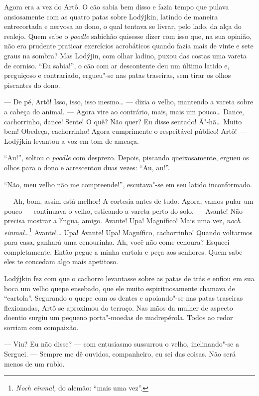 Agora era a vez do Artô. O cão sabia bem disso e fazia tempo que pulava
ansiosamente com as quatro patas sobre Lodýjkin, latindo de maneira
entrecortada e nervosa ao dono, o qual tentava se livrar, pelo lado, da
alça do realejo. Quem sabe o \emph{poodle} sabichão quisesse dizer com
isso que, na sua opinião, não era prudente praticar exercícios
acrobáticos quando fazia mais de vinte e sete graus na sombra? Mas
Lodýjin, com olhar ladino, puxou das costas uma vareta de corniso. ``Eu
sabia!'', o cão com ar descontente deu um último latido e, preguiçoso e
contrariado, ergueu"-se nas patas traseiras, sem tirar os olhos piscantes
do dono.

--- De pé, Artô! Isso, isso, isso mesmo\ldots{} --- dizia o velho, mantendo a
vareta sobre a cabeça do animal. --- Agora vire ao contrário, mais, mais
um pouco\ldots{} Dance, cachorrinho, dance! Sente! O quê? Não quer? Eu disse
sentado! Ã"-hã\ldots{} Muito bem! Obedeça, cachorrinho! Agora cumprimente o
respeitável público! Artô! --- Lodýjkin levantou a voz em tom de ameaça.

``Au!'', soltou o \emph{poodle} com desprezo. Depois, piscando queixosamente,
ergueu os olhos para o dono e acrescentou duas vezes: ``Au, au!''.

``Não, meu velho não me compreende!'', escutava"-se em seu latido
inconformado.

--- Ah, bom, assim está melhor! A cortesia antes de tudo. Agora, vamos
pular um pouco --- continuava o velho, esticando a vareta perto do solo.
--- Avante! Não precisa mostrar a língua, amigo. Avante! Upa! Magnífico!
Mais uma vez, \emph{noch einmal}\ldots{}\footnote{\emph{Noch einmal,} do
  alemão: ``mais uma vez''.} Avante!\ldots{} Upa! Avante! Upa! Magnífico,
cachorrinho! Quando voltarmos para casa, ganhará uma cenourinha. Ah,
você não come cenoura? Esqueci completamente. Então pegue a minha
cartola e peça aos senhores. Quem sabe eles te concedam algo mais
apetitoso.

Lodýjkin fez com que o cachorro levantasse sobre as patas de trás e
enfiou em sua boca um velho quepe ensebado, que ele muito
espirituosamente chamava de ``cartola''. Segurando o quepe com os dentes
e apoiando"-se nas patas traseiras flexionadas, Artô se aproximou do
terraço. Nas mãos da mulher de aspecto doentio surgiu um pequeno
porta"-moedas de madrepérola. Todos ao redor sorriam com compaixão.

--- Viu? Eu não disse? --- com entusiasmo sussurrou o velho,
inclinando"-se a Serguei. --- Sempre me dê ouvidos, companheiro, eu sei
das coisas. Não será menos de um rublo.

